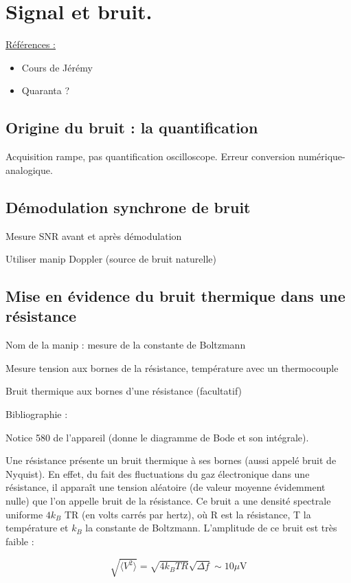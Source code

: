 \documentclass{article}%
\begin{document}
\section{Signal et bruit.}
\underline{Références :}
\begin{itemize}
	\item Cours de Jérémy
	\item Quaranta ?
\end{itemize}

\subsection{Origine du bruit : la quantification}

Acquisition rampe, pas quantification oscilloscope. Erreur conversion numérique-analogique.

\subsection{Démodulation synchrone de bruit}
Mesure SNR avant et après démodulation

Utiliser manip Doppler (source de bruit \og{}naturelle\fg{})

\subsection{Mise en évidence du bruit thermique dans une résistance}

Nom de la manip : mesure de la constante de Boltzmann

Mesure tension aux bornes de la résistance, température avec un thermocouple

Bruit thermique aux bornes d'une résistance (facultatif)

Bibliographie :

Notice 580 de l'appareil (donne le diagramme de Bode et son intégrale).

Une résistance présente un bruit thermique à ses bornes (aussi appelé bruit de Nyquist). En effet, du fait des fluctuations du gaz électronique dans une résistance, il apparaît une tension aléatoire (de valeur moyenne évidemment nulle) que l'on appelle bruit de la résistance. Ce bruit a une densité spectrale uniforme $4k_B$ TR (en volts carrés par hertz), où R est la résistance, T la température et $k_{B}$ la constante de Boltzmann. L'amplitude de ce bruit est très faible :

\[\sqrt{\langle V^2\rangle}=\sqrt{4k_BTR}\sqrt{\Delta f} \sim 10 \mu\textrm{V}\]
\end{document}
